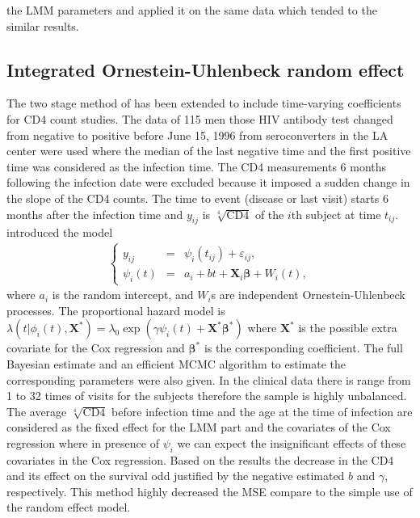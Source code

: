 \documentclass[]{article}
\begin{document}
the LMM parameters and applied it on the same data which tended to the similar results. 
		
		\subsection{Integrated Ornestein-Uhlenbeck random effect}
 		The two stage method of \cite{Tsiatis1995} has been extended to include time-varying coefficients for CD4 count studies. The data of 115 men those HIV antibody test changed from negative to positive before June 15, 1996  from seroconverters in the LA center were used where the median of the last negative time and the first positive time was considered as the infection time. The CD4 measurements 6 months following the infection date were excluded because it imposed a sudden change in the slope of the CD4 counts. The time to event (disease or last visit) starts 6 months after the infection time and $y_{ij}$ is $\sqrt[4]{\mathrm{CD4}}$ of the $i$th subject at time $t_{ij}$. \cite{WangTaylor2001} introduced the model 
 		\begin{eqnarray*}
 			\left\{
 			\begin{array}{lcl}
 				y_{ij}&=&\psi_i(t_{ij})+\varepsilon_{ij},\\
 				\psi_i(t)&=&a_i+bt+\mathbf{X}_i\boldsymbol{\beta}+W_i(t),
 			\end{array}\right.
 		\end{eqnarray*}
 		where $a_i$ is the random intercept, and $W_i$s are independent Ornestein-Uhlenbeck processes. The proportional hazard model is $\lambda(t|\phi_i(t),\mathbf{X}^*)=\lambda_0\exp(\gamma\psi_i(t)+\mathbf{X}^*\boldsymbol{\beta}^*)$ where $\mathbf{X}^*$ is the possible extra covariate for the Cox regression and $\boldsymbol{\beta}^*$ is the corresponding coefficient. The full Bayesian estimate and an efficient MCMC algorithm to estimate the corresponding parameters were also given. In the clinical data there is range from 1 to 32 times of visits for the subjects therefore the sample is highly unbalanced. The average $\sqrt[4]{\mathrm{CD4}}$ before infection time and the age at the time of infection are considered as the fixed effect for the LMM part and the covariates of the Cox regression where in presence of $\psi_i$ we can expect the insignificant effects of these covariates in the Cox regression. Based on the results the decrease in the CD4 and its effect on the survival odd justified by the negative estimated $b$ and $\gamma$, respectively. This method 
 		highly decreased the MSE compare to the simple use of the random effect model. 
 		
\end{document}
